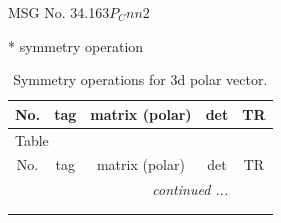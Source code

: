 \documentclass[fleqn,8pt]{jsarticle}
\begin{document}
\setcounter{MaxMatrixCols}{32}

\renewcommand{\tablename}{Table~}
\renewcommand{\figurename}{Figure~}
\begin{center}
\LARGE
MSG No. 34.163\quad$P_{C}nn2$
\end{center}
* symmetry operation
\renewcommand{\arraystretch}{1.3}
\begin{longtable}{ccccc}
\caption{Symmetry operations for 3d polar vector.}
 \\
 \hline \hline
No. & tag & matrix (polar) & det & TR \\ \hline \endfirsthead

\multicolumn{4}{l}{\tablename\ \thetable{}} \\
 \hline \hline
No. & tag & matrix (polar) & det & TR \\ \hline \endhead

 \hline \hline
\multicolumn{4}{r}{\footnotesize\it continued ...} \\ \endfoot

 \hline \hline
\multicolumn{4}{r}{} \\ \endlastfoot


\end{longtable}
\end{document}
